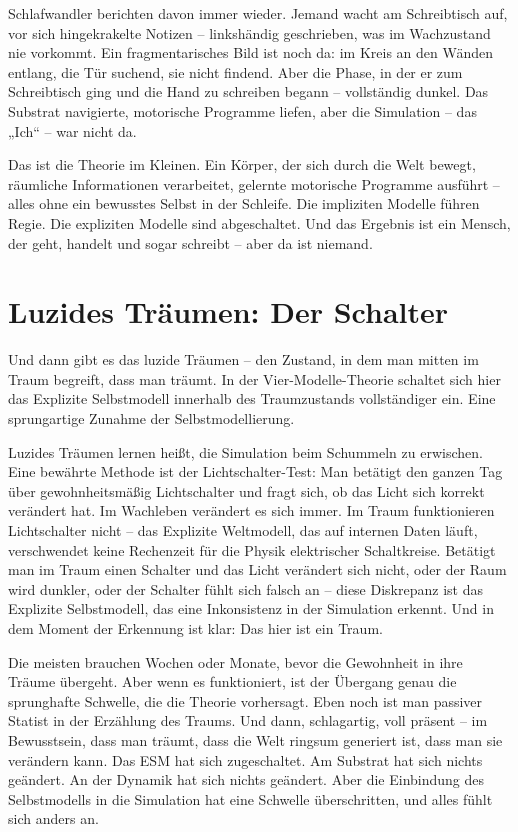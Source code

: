 \documentclass[11pt, twoside, openright]{book}
\begin{document}
Schlafwandler berichten davon immer wieder. Jemand wacht am Schreibtisch auf, vor sich hingekrakelte Notizen -- linkshändig geschrieben, was im Wachzustand nie vorkommt. Ein fragmentarisches Bild ist noch da: im Kreis an den Wänden entlang, die Tür suchend, sie nicht findend. Aber die Phase, in der er zum Schreibtisch ging und die Hand zu schreiben begann -- vollständig dunkel. Das Substrat navigierte, motorische Programme liefen, aber die Simulation -- das „Ich“ -- war nicht da.

Das ist die Theorie im Kleinen. Ein Körper, der sich durch die Welt bewegt, räumliche Informationen verarbeitet, gelernte motorische Programme ausführt -- alles ohne ein bewusstes Selbst in der Schleife. Die impliziten Modelle führen Regie. Die expliziten Modelle sind abgeschaltet. Und das Ergebnis ist ein Mensch, der geht, handelt und sogar schreibt -- aber da ist niemand.

\section*{Luzides Träumen: Der Schalter}

Und dann gibt es das luzide Träumen -- den Zustand, in dem man mitten im Traum begreift, dass man träumt. In der Vier-Modelle-Theorie schaltet sich hier das Explizite Selbstmodell innerhalb des Traumzustands vollständiger ein. Eine sprungartige Zunahme der Selbstmodellierung.

Luzides Träumen lernen heißt, die Simulation beim Schummeln zu erwischen. Eine bewährte Methode ist der Lichtschalter-Test: Man betätigt den ganzen Tag über gewohnheitsmäßig Lichtschalter und fragt sich, ob das Licht sich korrekt verändert hat. Im Wachleben verändert es sich immer. Im Traum funktionieren Lichtschalter nicht -- das Explizite Weltmodell, das auf internen Daten läuft, verschwendet keine Rechenzeit für die Physik elektrischer Schaltkreise. Betätigt man im Traum einen Schalter und das Licht verändert sich nicht, oder der Raum wird dunkler, oder der Schalter fühlt sich falsch an -- diese Diskrepanz ist das Explizite Selbstmodell, das eine Inkonsistenz in der Simulation erkennt. Und in dem Moment der Erkennung ist klar: Das hier ist ein Traum.

Die meisten brauchen Wochen oder Monate, bevor die Gewohnheit in ihre Träume übergeht. Aber wenn es funktioniert, ist der Übergang genau die sprunghafte Schwelle, die die Theorie vorhersagt. Eben noch ist man passiver Statist in der Erzählung des Traums. Und dann, schlagartig, voll präsent -- im Bewusstsein, dass man träumt, dass die Welt ringsum generiert ist, dass man sie verändern kann. Das ESM hat sich zugeschaltet. Am Substrat hat sich nichts geändert. An der Dynamik hat sich nichts geändert. Aber die Einbindung des Selbstmodells in die Simulation hat eine Schwelle überschritten, und alles fühlt sich anders an.
\end{document}

